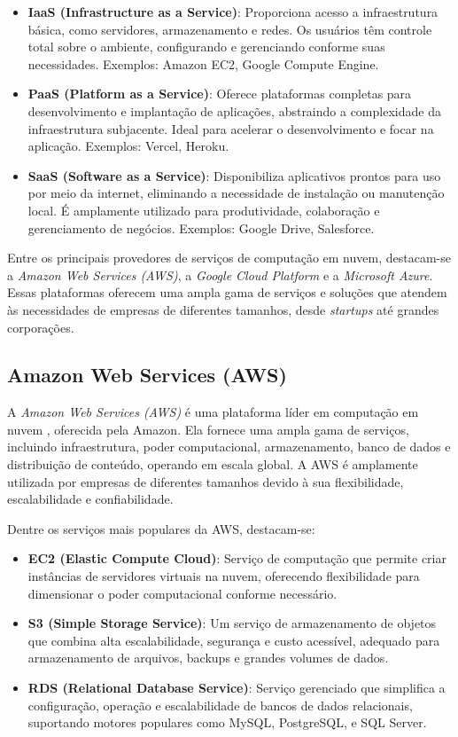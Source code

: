 \begin{itemize}
    \item \textbf{IaaS (Infrastructure as a Service)}: Proporciona acesso a infraestrutura básica, como servidores, armazenamento e redes. Os usuários têm controle total sobre o ambiente, configurando e gerenciando conforme suas necessidades. Exemplos: Amazon EC2, Google Compute Engine.
    \item \textbf{PaaS (Platform as a Service)}: Oferece plataformas completas para desenvolvimento e implantação de aplicações, abstraindo a complexidade da infraestrutura subjacente. Ideal para acelerar o desenvolvimento e focar na aplicação. Exemplos: Vercel, Heroku.
    \item \textbf{SaaS (Software as a Service)}: Disponibiliza aplicativos prontos para uso por meio da internet, eliminando a necessidade de instalação ou manutenção local. É amplamente utilizado para produtividade, colaboração e gerenciamento de negócios. Exemplos: Google Drive, Salesforce.
\end{itemize}

Entre os principais provedores de serviços de computação em nuvem, destacam-se a \emph{Amazon Web Services (AWS)}, a \emph{Google Cloud Platform} e a \emph{Microsoft Azure}. Essas plataformas oferecem uma ampla gama de serviços e soluções que atendem às necessidades de empresas de diferentes tamanhos, desde \emph{startups} até grandes corporações.

\subsection{Amazon Web Services (AWS)}


A \emph{Amazon Web Services (AWS)} é uma plataforma líder em computação em nuvem \cite{cloud-ranking}, oferecida pela Amazon. Ela fornece uma ampla gama de serviços, incluindo infraestrutura, poder computacional, armazenamento, banco de dados e distribuição de conteúdo, operando em escala global. A AWS é amplamente utilizada por empresas de diferentes tamanhos devido à sua flexibilidade, escalabilidade e confiabilidade.

Dentre os serviços mais populares da AWS, destacam-se:

\begin{itemize}
    \item \textbf{EC2 (Elastic Compute Cloud)}: Serviço de computação que permite criar instâncias de servidores virtuais na nuvem, oferecendo flexibilidade para dimensionar o poder computacional conforme necessário.
    \item \textbf{S3 (Simple Storage Service)}: Um serviço de armazenamento de objetos que combina alta escalabilidade, segurança e custo acessível, adequado para armazenamento de arquivos, backups e grandes volumes de dados.
    \item \textbf{RDS (Relational Database Service)}: Serviço gerenciado que simplifica a configuração, operação e escalabilidade de bancos de dados relacionais, suportando motores populares como MySQL, PostgreSQL, e SQL Server.
\end{itemize}

